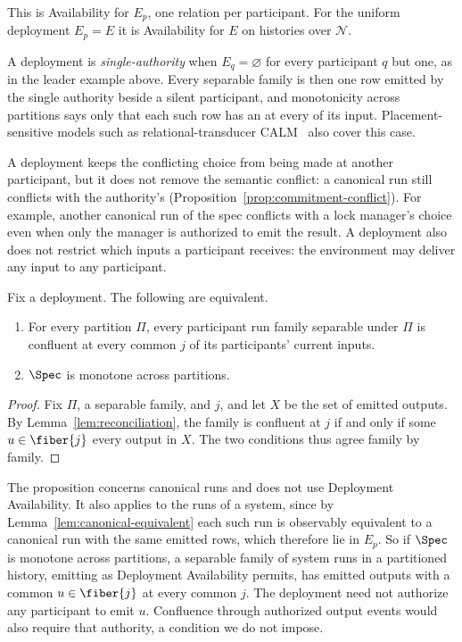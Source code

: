 This is Availability for $E_p$, one relation per participant.  For the uniform
deployment $E_p=E$ it is Availability for $E$ on histories over $\mathcal N$.

A deployment is \emph{single-authority} when $E_q=\varnothing$ for every
participant $q$ but one, as in the leader example above.  Every separable
family is then one row emitted by the single authority beside a silent
participant, and monotonicity across partitions says only that each such row
has an \outnoun at every \indesc of its input.  Placement-sensitive models
such as relational-transducer CALM~\cite{ameloot2013relational,ameloot2015weaker}
also cover this case.

A deployment keeps the conflicting choice from being made at another
participant, but it does not remove the semantic conflict: a canonical run
still conflicts with the authority's \commitment
(Proposition~\ref{prop:commitment-conflict}).  For example, another canonical
run of the spec conflicts with a lock manager's choice even when only the
manager is authorized to emit the result.  A deployment also does not restrict
which inputs a participant receives: the environment may deliver any input to
any participant.

\begin{proposition}
\label{thm:complete-cap-deployment}
Fix a deployment.  The following are equivalent.
\begin{enumerate}
  \item For every partition $\Pi$, every participant run family separable
        under $\Pi$ is confluent at every common \indesc $j$ of its
        participants' current inputs.
  \item $\Spec$ is monotone across partitions.
\end{enumerate}
\end{proposition}

\begin{proof}
Fix $\Pi$, a separable family, and $j$, and let $X$ be the set of emitted
outputs.  By Lemma~\ref{lem:reconciliation}, the family is confluent at $j$ if
and only if some $u\in\fiber{j}$ \outrel every output in $X$.  The two
conditions thus agree family by family.
\end{proof}

The proposition concerns canonical runs and does not use Deployment
Availability.  It also applies to the runs of a system, since by
Lemma~\ref{lem:canonical-equivalent} each such run is observably equivalent to
a canonical run with the same emitted rows, which therefore lie in $E_p$.  So
if $\Spec$ is monotone across partitions, a separable family of system runs in
a partitioned history, emitting as Deployment Availability permits, has
emitted outputs with a common \outnoun $u\in\fiber{j}$ at every common
\indesc $j$.  The deployment need not authorize any participant to emit $u$.
Confluence through authorized output events would also require that
authority, a condition we do not impose.


